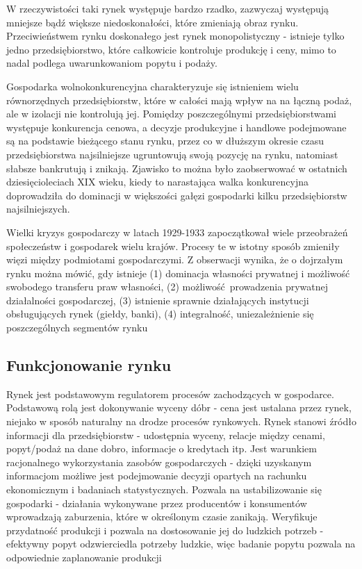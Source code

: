 \documentclass[12pt]{extarticle}
\begin{document}
W rzeczywistości taki rynek występuje bardzo rzadko, zazwyczaj występują mniejsze bądź większe niedoskonałości, które zmieniają obraz rynku. Przeciwieństwem rynku doskonałego jest rynek monopolistyczny - istnieje tylko jedno przedsiębiorstwo, które całkowicie kontroluje produkcję i ceny, mimo to nadal podlega uwarunkowaniom popytu i podaży.

Gospodarka wolnokonkurencyjna charakteryzuje się istnieniem wielu równorzędnych przedsiębiorstw, które w całości mają wpływ na na łączną podaż, ale w izolacji nie kontrolują jej. Pomiędzy poszczególnymi przedsiębiorstwami występuje konkurencja cenowa, a decyzje produkcyjne i handlowe podejmowane są na podstawie bieżącego stanu rynku, przez co w dłuższym okresie czasu przedsiębiorstwa najsilniejsze ugruntowują swoją pozycję na rynku, natomiast słabsze bankrutują i znikają. Zjawisko to można było zaobserwować w ostatnich dziesięcioleciach XIX wieku, kiedy to narastająca walka konkurencyjna doprowadziła do dominacji w większości gałęzi gospodarki kilku przedsiębiorstw najsilniejszych.

Wielki kryzys gospodarczy w latach 1929-1933 zapoczątkował wiele przeobrażeń społeczeństw i gospodarek wielu krajów. Procesy te w istotny sposób zmieniły więzi między podmiotami gospodarczymi. Z obserwacji wynika, że o dojrzałym rynku można mówić, gdy istnieje (1)	 dominacja własności prywatnej i możliwość swobodego transferu praw własności, (2)	możliwość prowadzenia prywatnej działalności gospodarczej, (3) istnienie sprawnie działających instytucji obsługujących rynek (giełdy, banki), (4)  integralność, uniezależnienie się poszczególnych segmentów rynku


\subsection{Funkcjonowanie rynku}

Rynek jest podstawowym regulatorem procesów zachodzących w gospodarce. Podstawową rolą jest dokonywanie wyceny dóbr - cena jest ustalana przez rynek, niejako w sposób naturalny na drodze procesów rynkowych. Rynek stanowi źródło informacji dla przedsiębiorstw - udostępnia wyceny, relacje między cenami, popyt/podaż na dane dobro, informacje o kredytach itp. Jest warunkiem racjonalnego wykorzystania zasobów gospodarczych - dzięki uzyskanym informacjom możliwe jest podejmowanie decyzji opartych na rachunku ekonomicznym i badaniach statystycznych. Pozwala na ustabilizowanie się gospodarki - działania wykonywane przez producentów i konsumentów wprowadzają zaburzenia, które w określonym czasie zanikają. Weryfikuje przydatność produkcji i pozwala na dostosowanie jej do ludzkich potrzeb - efektywny popyt odzwierciedla potrzeby ludzkie, więc badanie popytu pozwala na odpowiednie zaplanowanie produkcji
\end{document}
